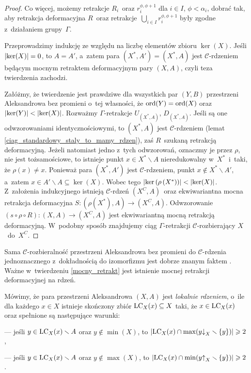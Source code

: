 \begin{proof}
Co więcej, możemy retrakcje $R_i$~oraz $r_i^{\phi,\phi+1}$ dla $i\in I$, $\phi<\alpha_i$, dobrać tak, aby retrakcja deformacyjna $R$~oraz retrakcje~$\bigcup_{i\in I}r_i^{\phi,\phi+1}$ były zgodne z~działaniem grupy~$\Gamma$.

Przeprowadzimy indukcję ze względu na liczbę elementów zbioru $\ker(X)$. Jeśli $\left|\operatorname{ker}(X)\right|=0$, to $A=A'$, a~zatem para $(X^*,A')=(X^*,A)$ jest $\mathcal{C}$-rdzeniem będącym mocnym retraktem deformacyjnym pary $(X,A)$, czyli teza twierdzenia zachodzi. 

Załóżmy, że twierdzenie jest prawdziwe dla wszystkich par $(Y,B)$ przestrzeni Aleksandrowa bez promieni o~tej własności, że $\operatorname{ord}(Y)=\operatorname{ord}(X)$ oraz $\left|\operatorname{ker}(Y)\right|<\left|\operatorname{ker}(X)\right|$. Rozważmy $\Gamma$-retrakcje $U_{(X^*,A)}$, $D_{(X^*,A)}$. Jeśli są one odwzorowaniami identycznościowymi, to $(X^*,A)$ jest $\mathcal{C}$-rdzeniem (lemat \ref{ciag_standardowy_staly_to_mamy_rdzen}), zaś $R$~szukaną retrakcją deformacyjną. Jeżeli natomiast jedno z~tych odwzorowań, oznaczmy je przez $\rho$, nie jest tożsamościowe, to istnieje punkt \mbox{$x\in X^*\smallsetminus A$} nieredukowalny w~$X^*$~i~taki, że $\rho(x)\not=x$. Ponieważ para $\left(X^*,A'\right)$ jest \mbox{$\mathcal{C}$-rdzeniem}, punkt \mbox{$x\not\in X^*\smallsetminus A'$}, a~zatem $x\in A'\smallsetminus A\subseteq \ker(X)$. Wobec tego $\left|\operatorname{ker}\left(\rho\left(X^*\right)\right)\right|<\left|\operatorname{ker}(X)\right|$. Z~założenia indukcyjnego istnieją $\mathcal{C}$-rdzeń $\left(X^C,A\right)$~oraz ekwiwariantna mocna retrakcja deformacyjna $S\colon \left(\rho\left(X^*\right),A\right)\to \left(X^C,A\right)$. Odwzorowanie \mbox{$(s\circ \rho\circ R)\colon (X,A)\to \left(X^C,A\right)$} jest ekwiwariantną mocną retrakcją deformacyjną. W~podobny sposób znajdujemy ciąg $\Gamma$-retrakcji $\mathcal{C}$-rozbierający $X$~do~$X^C$.
\end{proof}

Sama $\mathcal{C}$-rozbieralność przestrzeni Aleksandrowa bez promieni do $\mathcal{C}$-rdzenia jednoznacznego z~dokładnością do izomorfizmu jest dobrze znanym faktem \cite[Corollary 3.15]{Schroder99}.  Ważne w~twierdzeniu \ref{mocny_retrakt} jest istnienie mocnej retrakcji deformacyjnej na rdzeń.

Mówimy, że para przestrzeni Aleksandrowa $(X,A)$ jest \textit{lokalnie rdzeniem}, o~ile dla każdego $x\in X$ istnieje skończony zbiór $\operatorname{LC}_X(x)\subseteq X$ taki, że $x\in\operatorname{LC}_X(x)$ oraz spełnione są następujące warunki:
\begin{compactitem}
\item[---] jeśli $y\in\operatorname{LC}_X(x)\smallsetminus A$ oraz $y\not\in\min(X)$, to $\left|\operatorname{LC}_X(x)\cap\max(y\mathord{\downarrow}_X\smallsetminus\{y\})\right|\geqslant 2$,
\item[---] jeśli $y\in\operatorname{LC}_X(x)\smallsetminus A$ oraz $y\not\in\max(X)$, to $\left|\operatorname{LC}_X(x)\cap\min(y\mathord{\uparrow}_X\smallsetminus\{y\})\right|\geqslant 2$. 
\end{compactitem}

